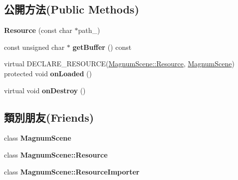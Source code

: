 \subsection*{公開方法(Public Methods)}
\begin{DoxyCompactItemize}
\item 
{\bfseries Resource} (const char $\ast$path\+\_\+)\hypertarget{class_magnum_1_1_magnum_scene_1_1_resource_acf08499df6dc0d6a29e2ecf333b381c5}{}\label{class_magnum_1_1_magnum_scene_1_1_resource_acf08499df6dc0d6a29e2ecf333b381c5}

\item 
const unsigned char $\ast$ {\bfseries get\+Buffer} () const \hypertarget{class_magnum_1_1_magnum_scene_1_1_resource_a7b8c19567e1e98a9f839a477bf1570b7}{}\label{class_magnum_1_1_magnum_scene_1_1_resource_a7b8c19567e1e98a9f839a477bf1570b7}

\item 
virtual D\+E\+C\+L\+A\+R\+E\+\_\+\+R\+E\+S\+O\+U\+R\+CE(\hyperlink{class_magnum_1_1_magnum_scene_1_1_resource}{Magnum\+Scene\+::\+Resource}, \hyperlink{class_magnum_1_1_magnum_scene}{Magnum\+Scene}) protected void {\bfseries on\+Loaded} ()\hypertarget{class_magnum_1_1_magnum_scene_1_1_resource_a057e384e1631ef5593deea88f00d7d5c}{}\label{class_magnum_1_1_magnum_scene_1_1_resource_a057e384e1631ef5593deea88f00d7d5c}

\item 
virtual void {\bfseries on\+Destroy} ()\hypertarget{class_magnum_1_1_magnum_scene_1_1_resource_a72d9f37f9ea18b990ffb62d2f153ed27}{}\label{class_magnum_1_1_magnum_scene_1_1_resource_a72d9f37f9ea18b990ffb62d2f153ed27}

\end{DoxyCompactItemize}
\subsection*{類別朋友(Friends)}
\begin{DoxyCompactItemize}
\item 
class {\bfseries Magnum\+Scene}\hypertarget{class_magnum_1_1_magnum_scene_1_1_resource_a0f518a37dee4252bc83e1953ecf3e240}{}\label{class_magnum_1_1_magnum_scene_1_1_resource_a0f518a37dee4252bc83e1953ecf3e240}

\item 
class {\bfseries Magnum\+Scene\+::\+Resource}\hypertarget{class_magnum_1_1_magnum_scene_1_1_resource_ad6ab972c70e10994a4dc5940fd732571}{}\label{class_magnum_1_1_magnum_scene_1_1_resource_ad6ab972c70e10994a4dc5940fd732571}

\item 
class {\bfseries Magnum\+Scene\+::\+Resource\+Importer}\hypertarget{class_magnum_1_1_magnum_scene_1_1_resource_a2a9515b539dbf6a1c27e41cbdc8d4ced}{}\label{class_magnum_1_1_magnum_scene_1_1_resource_a2a9515b539dbf6a1c27e41cbdc8d4ced}

\end{DoxyCompactItemize}
